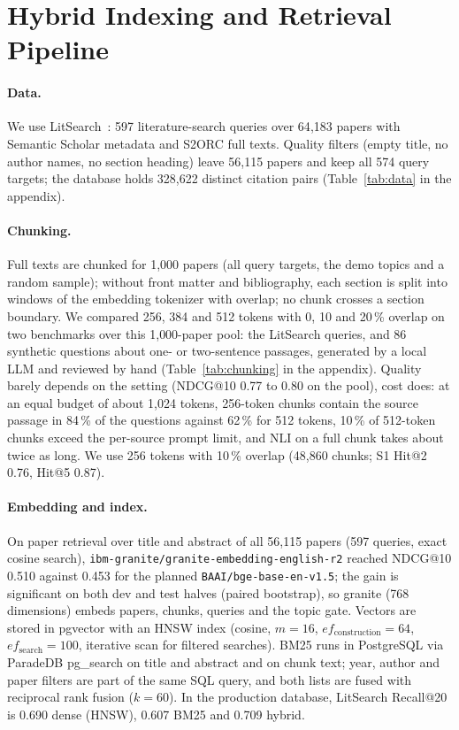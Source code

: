 \section{Hybrid Indexing and Retrieval Pipeline}
\label{sec:retrieval}

\paragraph{Data.}
We use LitSearch~\cite{ajith2024litsearch}: 597 literature-search queries over 64{,}183 papers with Semantic Scholar metadata and S2ORC full texts.
Quality filters (empty title, no author names, no section heading) leave 56{,}115 papers and keep all 574 query targets; the database holds 328{,}622 distinct citation pairs (Table~\ref{tab:data} in the appendix).
\paragraph{Chunking.}
Full texts are chunked for 1{,}000 papers (all query targets, the demo topics and a random sample); without front matter and bibliography, each section is split into windows of the embedding tokenizer with overlap; no chunk crosses a section boundary.
We compared 256, 384 and 512 tokens with 0, 10 and 20\,\% overlap on two benchmarks over this 1{,}000-paper pool: the LitSearch queries, and 86 synthetic questions about one- or two-sentence passages, generated by a local LLM and reviewed by hand (Table~\ref{tab:chunking} in the appendix). Quality barely depends on the setting (NDCG@10 0.77 to 0.80 on the pool), cost does: at an equal budget of about 1{,}024 tokens, 256-token chunks contain the source passage in 84\,\% of the questions against 62\,\% for 512 tokens, 10\,\% of 512-token chunks exceed the per-source prompt limit, and NLI on a full chunk takes about twice as long.
We use 256 tokens with 10\,\% overlap (48{,}860 chunks; S1 Hit@2 0.76, Hit@5 0.87).

\paragraph{Embedding and index.}
On paper retrieval over title and abstract of all 56{,}115 papers (597 queries, exact cosine search), \texttt{ibm-granite/granite-embedding-english-r2} reached NDCG@10 0.510 against 0.453 for the planned \texttt{BAAI/bge-base-en-v1.5}; the gain is significant on both dev and test halves (paired bootstrap), so granite (768 dimensions) embeds papers, chunks, queries and the topic gate.
Vectors are stored in pgvector with an HNSW index (cosine, $m=16$, $ef_\mathrm{construction}=64$, $ef_\mathrm{search}=100$, iterative scan for filtered searches).
BM25 runs in PostgreSQL via ParadeDB pg\_search on title and abstract and on chunk text; year, author and paper filters are part of the same SQL query, and both lists are fused with reciprocal rank fusion ($k=60$).
In the production database, LitSearch Recall@20 is 0.690 dense (HNSW), 0.607 BM25 and 0.709 hybrid.

